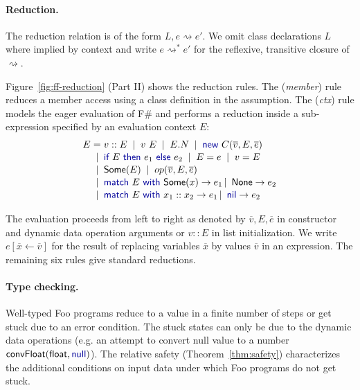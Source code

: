 \documentclass[10pt]{sigplanconf}
\newcommand{\kvd}[1]{\textnormal{\textcolor{kvdclr}{\sffamily #1}}}
\newcommand{\ident}[1]{\textnormal{\sffamily #1}}
\newcommand{\lsep}[0]{\;\; | \;\;}
\newcommand{\narrow}[1]{\hspace{-0.7em} #1 \hspace{-0.7em}}
\newcommand{\reduce}{\rightsquigarrow}
\begin{document}

\paragraph{Reduction.}
The reduction relation is of the form $L, e \reduce e'$. We omit class declarations 
$L$ where implied by context and write $e \reduce^{*} e'$ for
the reflexive, transitive closure of $\reduce$. 

Figure~\ref{fig:ff-reduction} (Part II) shows the reduction rules.  The (\emph{member}) rule reduces 
a member access using a class definition in the assumption. The (\emph{ctx}) rule models the eager
evaluation of F\# and performs a reduction inside a sub-expression specified by an evaluation 
context $E$:
%
\begin{equation*}
\begin{array}{rcl}
 E &\narrow{=}& v::E \lsep v~E \lsep E.N \lsep \kvd{new}~C(\overline{v}, E, \overline{e})\\[0.1em]
   &\narrow{|}&  \kvd{if}~E~\kvd{then}~e_1~\kvd{else}~e_2  \lsep E = e \lsep v = E \\[0.1em]
   &\narrow{|}& \ident{Some}(E) \lsep op(\overline{v}, E, \overline{e})\\[0.1em]
   &\narrow{|}& \kvd{match}~E~\kvd{with}~\ident{Some}(x) \rightarrow e_1 \,|\, \ident{None} \rightarrow e_2 \\[0.1em]
   &\narrow{|}& \kvd{match}~E~\kvd{with}~x_1 :: x_2 \rightarrow e_1 \,|\, \kvd{nil} \rightarrow e_2
\end{array} 
\end{equation*}

\noindent
The evaluation proceeds from left to right as denoted by $\overline{v}, E, \overline{e}$ in 
constructor and dynamic data operation arguments or $v::E$ in list initialization.
We write $e[\overline{x} \leftarrow \overline{v}]$ for the result of replacing variables $\overline{x}$ by
values $\overline{v}$ in an expression. The remaining six rules
give standard reductions.


\paragraph{Type checking.} 
Well-typed Foo programs reduce to a value in a finite number of steps or get stuck due to an
error condition. The stuck states can only be due to the dynamic data operations (e.g. an attempt
to convert \kvd{null} value to a number $\ident{convFloat}(\ident{float},\kvd{null})$). The relative safety (Theorem~\ref{thm:safety})
characterizes the additional conditions on input data under which Foo programs do not get stuck.
\end{document}
